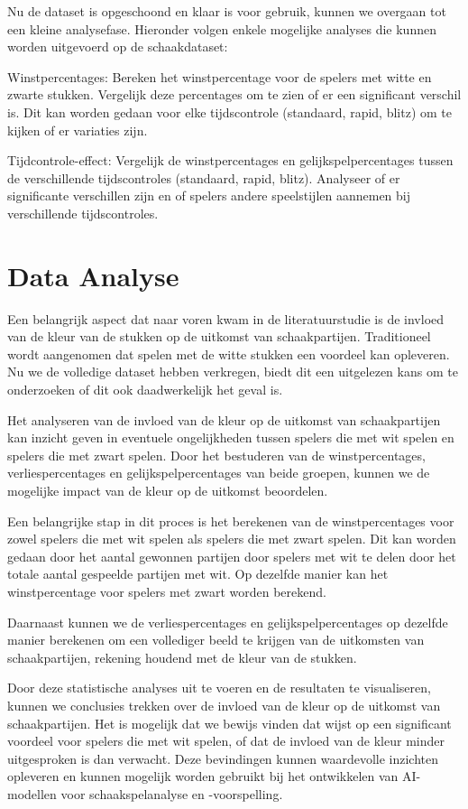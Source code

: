 Nu de dataset is opgeschoond en klaar is voor gebruik, kunnen we overgaan tot een kleine analysefase. Hieronder volgen enkele mogelijke analyses die kunnen worden uitgevoerd op de schaakdataset:

Winstpercentages: Bereken het winstpercentage voor de spelers met witte en zwarte stukken. Vergelijk deze percentages om te zien of er een significant verschil is. Dit kan worden gedaan voor elke tijdscontrole (standaard, rapid, blitz) om te kijken of er variaties zijn.

Tijdcontrole-effect: Vergelijk de winstpercentages en gelijkspelpercentages tussen de verschillende tijdscontroles (standaard, rapid, blitz). Analyseer of er significante verschillen zijn en of spelers andere speelstijlen aannemen bij verschillende tijdscontroles.

\section{Data Analyse}

Een belangrijk aspect dat naar voren kwam in de literatuurstudie is de invloed van de kleur van de stukken op de uitkomst van schaakpartijen. Traditioneel wordt aangenomen dat spelen met de witte stukken een voordeel kan opleveren. Nu we de volledige dataset hebben verkregen, biedt dit een uitgelezen kans om te onderzoeken of dit ook daadwerkelijk het geval is.

Het analyseren van de invloed van de kleur op de uitkomst van schaakpartijen kan inzicht geven in eventuele ongelijkheden tussen spelers die met wit spelen en spelers die met zwart spelen. Door het bestuderen van de winstpercentages, verliespercentages en gelijkspelpercentages van beide groepen, kunnen we de mogelijke impact van de kleur op de uitkomst beoordelen.

Een belangrijke stap in dit proces is het berekenen van de winstpercentages voor zowel spelers die met wit spelen als spelers die met zwart spelen. Dit kan worden gedaan door het aantal gewonnen partijen door spelers met wit te delen door het totale aantal gespeelde partijen met wit. Op dezelfde manier kan het winstpercentage voor spelers met zwart worden berekend.

Daarnaast kunnen we de verliespercentages en gelijkspelpercentages op dezelfde manier berekenen om een vollediger beeld te krijgen van de uitkomsten van schaakpartijen, rekening houdend met de kleur van de stukken.

Door deze statistische analyses uit te voeren en de resultaten te visualiseren, kunnen we conclusies trekken over de invloed van de kleur op de uitkomst van schaakpartijen. Het is mogelijk dat we bewijs vinden dat wijst op een significant voordeel voor spelers die met wit spelen, of dat de invloed van de kleur minder uitgesproken is dan verwacht. Deze bevindingen kunnen waardevolle inzichten opleveren en kunnen mogelijk worden gebruikt bij het ontwikkelen van AI-modellen voor schaakspelanalyse en -voorspelling.

